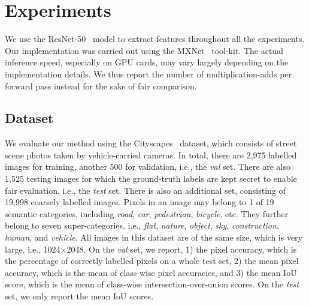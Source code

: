 \documentclass[10pt,twocolumn,letterpaper]{article}
\begin{document}
%
\section{Experiments}
%
We use the ResNet-50~\cite{ResNet.CVPR.2016.He} model to extract features throughout all the experiments.
Our implementation was carried out using the MXNet~\cite{MXNet.2015.Chen} tool-kit.
The actual inference speed, especially on GPU cards,
may vary largely depending on the implementation details.
We thus report the number of multiplication-adds per forward pass instead for the sake of fair comparison.


%
\subsection{Dataset}
We evaluate our method using the Cityscapes~\cite{Cityscapes.CVPR.2016.Cordts} dataset,
which consists of street scene photos taken by vehicle-carried cameras.
In total, there are 2,975 labelled images for training, another 500 for validation, i.e., the \textit{val} set.
There are also 1,525 testing images for which the ground-truth labels are kept secret to enable fair evaluation, i.e., the \textit{test} set.
There is also an additional set, consisting of 19,998 coarsely labelled images.
Pixels in an image may belong to 1 of 19 semantic categories, including \textit{road}, \textit{car}, \textit{pedestrian}, \textit{bicycle}, etc.
They further belong to seven super-categories, i.e., \textit{flat}, \textit{nature}, \textit{object}, \textit{sky}, \textit{construction}, \textit{human}, and \textit{vehicle}.
All images in this dataset are of the same size, which is very large, i.e., 1024$\times$2048.
On the \textit{val} set, we report,
1) the pixel accuracy, which is the percentage of correctly labelled pixels on a whole test set,
2) the mean pixel accuracy, which is the mean of class-wise pixel accuracies, and
3) the mean IoU score, which is the mean of class-wise intersection-over-union scores.
On the \textit{test} set, we only report the mean IoU scores.
%


%
\end{document}
